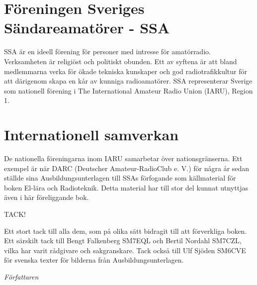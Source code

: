 \section*{Föreningen Sveriges Sändareamatörer - SSA}

SSA är en ideell förening för personer med intresse för amatörradio.
Verksamheten är religiöst och politiskt obunden. Ett av syftena är att bland
medlemmarna verka för ökade tekniska kunskaper och god radiotrafikkultur för att
därigenom skapa en kår av kunniga radioamatörer. SSA representerar Sverige som
nationell förening i The International Amateur Radio Union (IARU), Region 1.

\section*{Internationell samverkan}

De nationella föreningarna inom IARU samarbetar över nationsgränserna. Ett
exempel är när DARC (Deutscher Amateur-RadioClub e. V.) för några år sedan
ställde sina Ausbildungsunterlagen till SSAs förfogande som källmaterial för
boken El-lära och Radioteknik. Detta material har till stor del kunnat utnyttjas
även i här föreliggande bok.

\clearpage

TACK!

Ett stort tack till alla dem, som på olika sätt bidragit till att förverkliga
boken. Ett särskilt tack till Bengt Falkenberg SM7EQL och Bertil Nordahl SM7CZL,
vilka har varit rådgivare och sakgranskare. Tack också till Ulf Sjöden SM6CVE
för svenska texter för bilderna från Ausbildungsunterlagen.

\emph{Författaren}
